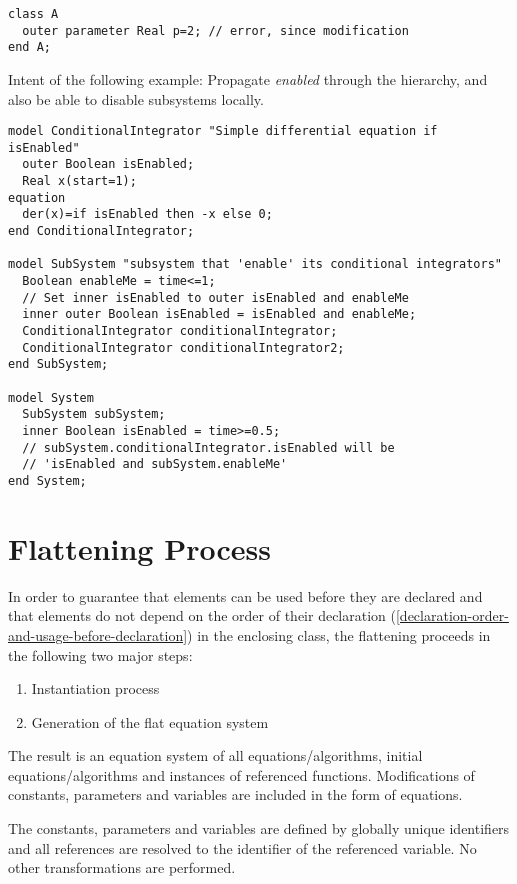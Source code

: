 \begin{example}
\begin{lstlisting}[language=modelica]
class A
  outer parameter Real p=2; // error, since modification
end A;
\end{lstlisting}

Intent of the following example: Propagate \emph{enabled} through
the hierarchy, and also be able to disable subsystems locally.
\begin{lstlisting}[language=modelica]
model ConditionalIntegrator "Simple differential equation if isEnabled"
  outer Boolean isEnabled;
  Real x(start=1);
equation
  der(x)=if isEnabled then -x else 0;
end ConditionalIntegrator;

model SubSystem "subsystem that 'enable' its conditional integrators"
  Boolean enableMe = time<=1;
  // Set inner isEnabled to outer isEnabled and enableMe
  inner outer Boolean isEnabled = isEnabled and enableMe;
  ConditionalIntegrator conditionalIntegrator;
  ConditionalIntegrator conditionalIntegrator2;
end SubSystem;

model System
  SubSystem subSystem;
  inner Boolean isEnabled = time>=0.5;
  // subSystem.conditionalIntegrator.isEnabled will be
  // 'isEnabled and subSystem.enableMe'
end System;
\end{lstlisting}
\end{example}

\section{Flattening Process}\label{flattening-process}

In order to guarantee that elements can be used before they are declared
and that elements do not depend on the order of their declaration
(\cref{declaration-order-and-usage-before-declaration}) in the enclosing class, the flattening proceeds in the
following two major steps:
\begin{enumerate}
\item
  Instantiation process
\item
  Generation of the flat equation system
\end{enumerate}

The result is an equation system of all equations/algorithms, initial
equations/algorithms and instances of referenced functions.
Modifications of constants, parameters and variables are included in the
form of equations.

The constants, parameters and variables are defined by globally unique
identifiers and all references are resolved to the identifier of the
referenced variable. No other transformations are performed.

